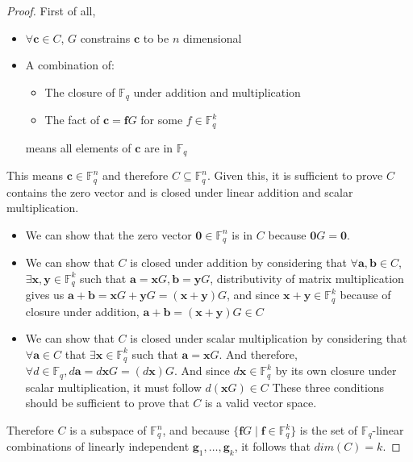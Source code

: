 \begin{proof}
    First of all, 
    \begin{itemize}
        \item $\forall \mathbf{c}\in C$, $G$ constrains $\mathbf{c}$ to be $n$ dimensional
        \item A combination of: 
        \begin{itemize}
            \item The closure of $\mathbb{F}_q$ under addition and multiplication 
            \item The fact of $\mathbf{c}=\mathbf{f}G$ for some $f\in \mathbb{F}^{k}_{q}$ 
        \end{itemize}
        means all elements of $\mathbf{c}$ are in $\mathbb{F}_q$
    \end{itemize}
    This means $\mathbf{c}\in \mathbb{F}^{n}_{q}$ and therefore $C\subseteq \mathbb{F}^{n}_{q}$. 
    Given this, it is sufficient to prove $C$ contains the zero vector and is closed under linear addition and scalar multiplication.
    \begin{itemize}
        \item We can show that the zero vector $\mathbf{0}\in \mathbb{F}^{n}_{q}$ is in $C$ because $\mathbf{0}G=\mathbf{0}$.
        \item We can show that $C$ is closed under addition by considering that $\forall \mathbf{a},\mathbf{b}\in C$,
            $\exists \mathbf{x},\mathbf{y}\in \mathbb{F}^{k}_{q}$ such that $\mathbf{a}=\mathbf{x}G,\mathbf{b}=\mathbf{y}G$,
            distributivity of matrix multiplication gives us $\mathbf{a}+\mathbf{b}=\mathbf{x}G+\mathbf{y}G=(\mathbf{x}+\mathbf{y})G$,
            and since $\mathbf{x}+\mathbf{y}\in \mathbb{F}^{k}_{q}$ because of closure under addition,
            $\mathbf{a}+\mathbf{b}=(\mathbf{x}+\mathbf{y})G\in C $
        \item We can show that $C$ is closed under scalar multiplication by considering that $\forall \mathbf{a}\in C$ that
            $\exists \mathbf{x}\in \mathbb{F}^{k}_{q}$ such that $\mathbf{a}=\mathbf{x}G$.
            And therefore, $\forall d\in \mathbb{F}_{q}, d\mathbf{a}=d\mathbf{x}G=(d\mathbf{x})G$.
            And since $d\mathbf{x}\in \mathbb{F}^{k}_{q}$ by its own closure under scalar multiplication, it must follow $d(\mathbf{x}G)\in C$
        These three conditions should be sufficient to prove that $C$ is a valid vector space.
    \end{itemize}
    Therefore $C$ is a subspace of $\mathbb{F}^{n}_{q}$, and because $\{\mathbf{f}G \mid \mathbf{f} \in \mathbb{F}^{k}_{q}\}$ is the set of $\mathbb{F}_q$-linear combinations of linearly independent $\mathbf{g}_{1},\ldots, \mathbf{g}_{k}$, it follows that $dim(C)=k$.
\end{proof}

